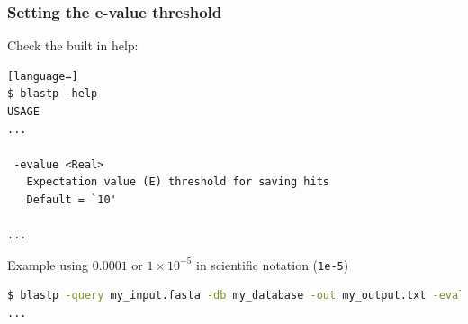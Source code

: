 \documentclass[table]{beamer}
\begin{document}
\begin{frame}[fragile]
\frametitle{Setting the e-value threshold}

Check the built in help:
\begin{lstlisting}[language=]
$ blastp -help
USAGE
...

 -evalue <Real>
   Expectation value (E) threshold for saving hits
   Default = `10'

...
\end{lstlisting}

Example using $0.0001$ or $1 \times 10^{-5}$ in scientific notation (\texttt{1e-5})
\begin{lstlisting}[language=sh]
$ blastp -query my_input.fasta -db my_database -out my_output.txt -evalue 1e-5
...
\end{lstlisting}
\end{frame}
     
    
\end{document}

